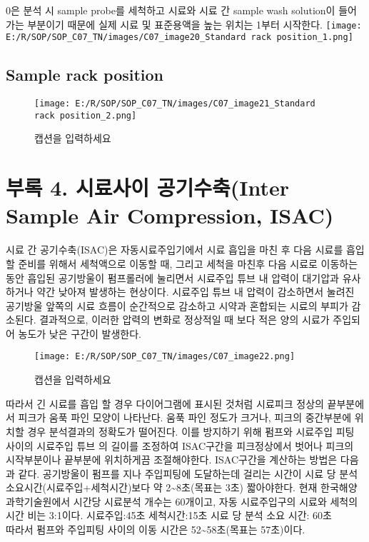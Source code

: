 \documentclass[
]{book}
\begin{document}
0은 분석 시 sample probe를 세척하고 시료와 시료 간 sample wash solution이 들어가는 부분이기 때문에 실제 시료 및 표준용액을 높는 위치는 1부터 시작한다.
\texttt{[image: E:/R/SOP/SOP\_C07\_TN/images/C07\_image20\_Standard rack position\_1.png]}

\hypertarget{sample-rack-position-2}{%
\subsection{Sample rack position}\label{sample-rack-position-2}}

\begin{figure}
\centering
\texttt{[image: E:/R/SOP/SOP\_C07\_TN/images/C07\_image21\_Standard rack position\_2.png]}
\caption{캡션을 입력하세요}
\end{figure}

\hypertarget{uxbd80uxb85d-4.-uxc2dcuxb8ccuxc0acuxc774-uxacf5uxae30uxc218uxcd95inter-sample-air-compression-isac-1}{%
\section{부록 4. 시료사이 공기수축(Inter Sample Air Compression, ISAC)}\label{uxbd80uxb85d-4.-uxc2dcuxb8ccuxc0acuxc774-uxacf5uxae30uxc218uxcd95inter-sample-air-compression-isac-1}}

시료 간 공기수축(ISAC)은 자동시료주입기에서 시료 흡입을 마친 후 다음 시료를 흡입 할 준비를 위해서 세척액으로 이동할 때, 그리고 세척을 마친후 다음 시료로 이동하는 동안 흡입된 공기방울이 펌프롤러에 눌리면서 시료주입 튜브 내 압력이 대기압과 유사하거나 약간 낮아져 발생하는 현상이다. 시료주입 튜브 내 압력이 감소하면서 눌려진 공기방울 앞쪽의 시료 흐름이 순간적으로 감소하고 시약과 혼합되는 시료의 부피가 감소된다. 결과적으로, 이러한 압력의 변화로 정상적일 때 보다 적은 양의 시료가 주입되어 농도가 낮은 구간이 발생한다.

\begin{figure}
\centering
\texttt{[image: E:/R/SOP/SOP\_C07\_TN/images/C07\_image22.png]}
\caption{캡션을 입력하세요}
\end{figure}

따라서 긴 시료를 흡입 할 경우 다이어그램에 표시된 것처럼 시료피크 정상의 끝부분에서 피크가 움푹 파인 모양이 나타난다. 움푹 파인 정도가 크거나, 피크의 중간부분에 위치할 경우 분석결과의 정확도가 떨어진다. 이를 방지하기 위해 펌프와 시료주입 피팅 사이의 시료주입 튜브 의 길이를 조정하여 ISAC구간을 피크정상에서 벗어나 피크의 시작부분이나 끝부분에 위치하게끔 조절해야한다. ISAC구간을 계산하는 방법은 다음과 같다. 공기방울이 펌프를 지나 주입피팅에 도달하는데 걸리는 시간이 시료 당 분석 소요시간(시료주입+세척시간)보다 약 2\textasciitilde8초(목표는 3초) 짧아야한다.
현재 한국해양과학기술원에서 시간당 시료분석 개수는 60개이고, 자동 시료주입구의 시료와 세척의 시간 비는 3:1이다.
시료주입:45초
세척시간:15초
시료 당 분석 소요 시간: 60초\\
따라서 펌프와 주입피팅 사이의 이동 시간은 52\textasciitilde58초(목표는 57초)이다.
\end{document}
